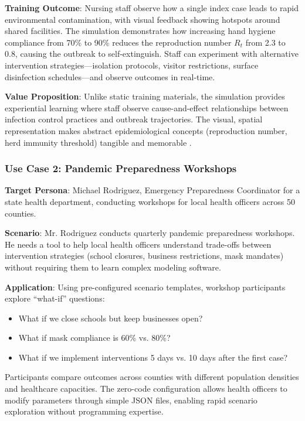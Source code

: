\textbf{Training Outcome}: Nursing staff observe how a single index case leads to rapid environmental contamination, with visual feedback showing hotspots around shared facilities. The simulation demonstrates how increasing hand hygiene compliance from 70\% to 90\% reduces the reproduction number $R_t$ from 2.3 to 0.8, causing the outbreak to self-extinguish. Staff can experiment with alternative intervention strategies---isolation protocols, visitor restrictions, surface disinfection schedules---and observe outcomes in real-time.

\textbf{Value Proposition}: Unlike static training materials, the simulation provides experiential learning where staff observe cause-and-effect relationships between infection control practices and outbreak trajectories. The visual, spatial representation makes abstract epidemiological concepts (reproduction number, herd immunity threshold) tangible and memorable \cite{gaba2004future}.

\subsubsection{Use Case 2: Pandemic Preparedness Workshops}

\textbf{Target Persona}: Michael Rodriguez, Emergency Preparedness Coordinator for a state health department, conducting workshops for local health officers across 50 counties.

\textbf{Scenario}: Mr. Rodriguez conducts quarterly pandemic preparedness workshops. He needs a tool to help local health officers understand trade-offs between intervention strategies (school closures, business restrictions, mask mandates) without requiring them to learn complex modeling software.

\textbf{Application}: Using pre-configured scenario templates, workshop participants explore ``what-if'' questions:
\begin{itemize}
    \item What if we close schools but keep businesses open?
    \item What if mask compliance is 60\% vs. 80\%?
    \item What if we implement interventions 5 days vs. 10 days after the first case?
\end{itemize}

Participants compare outcomes across counties with different population densities and healthcare capacities. The zero-code configuration allows health officers to modify parameters through simple JSON files, enabling rapid scenario exploration without programming expertise.

